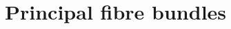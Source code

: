 \documentclass[a4paper,11pt]{article}
\theoremstyle{definition} %
\theoremstyle{plain} %
\theoremstyle{remark} %
\begin{document}
% 

% 

\setcounter{section}{18}
\section{Principal fibre bundles}





























\end{document}
